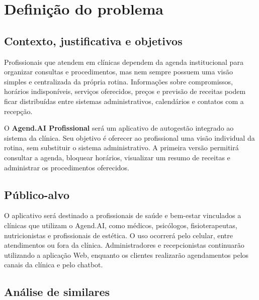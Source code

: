 \documentclass[
  12pt,
  openright,
  oneside,
  a4paper,
  english,
  brazil
]{abntex2}
\begin{document}
\frenchspacing

\pretextual
\imprimircapa
\imprimirfolhaderosto*

\tableofcontents*
\cleardoublepage

\textual

\chapter{Definição do problema}

\section{Contexto, justificativa e objetivos}

Profissionais que atendem em clínicas dependem da agenda institucional para organizar consultas e procedimentos, mas nem sempre possuem uma visão simples e centralizada da própria rotina. Informações sobre compromissos, horários indisponíveis, serviços oferecidos, preços e previsão de receitas podem ficar distribuídas entre sistemas administrativos, calendários e contatos com a recepção.

O \textbf{Agend.AI Profissional} será um aplicativo de autogestão integrado ao sistema da clínica. Seu objetivo é oferecer ao profissional uma visão individual da rotina, sem substituir o sistema administrativo. A primeira versão permitirá consultar a agenda, bloquear horários, visualizar um resumo de receitas e administrar os procedimentos oferecidos.

\section{Público-alvo}

O aplicativo será destinado a profissionais de saúde e bem-estar vinculados a clínicas que utilizam o Agend.AI, como médicos, psicólogos, fisioterapeutas, nutricionistas e profissionais de estética. O uso ocorrerá pelo celular, entre atendimentos ou fora da clínica. Administradores e recepcionistas continuarão utilizando a aplicação Web, enquanto os clientes realizarão agendamentos pelos canais da clínica e pelo chatbot.

\section{Análise de similares}
\end{document}
